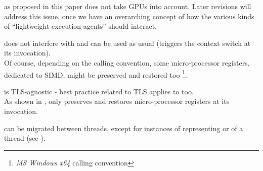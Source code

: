 

\cc as proposed in this paper does not take GPUs into account. Later revisions
will address this issue, once we have an overarching concept of how the various
kinds of ``lightweight execution agents'' should interact.



does not interfere with \cc and can be used as usual (\cc triggers the context
switch at its invocation).\\
Of course, depending on the calling convention, some micro-processor registers,
dedicated to SIMD, might be preserved and restored too
\footnote{\emph{MS Windows x64} calling convention}.



\cc is TLS-agnostic - best practice related to TLS applies to \cc too.\\
As shown in , \cc only preserves and restores
micro-processor registers at its invocation.



\cont can be migrated between threads, except for instances of
\cont representing \main or \entryfn of a thread (see ).

